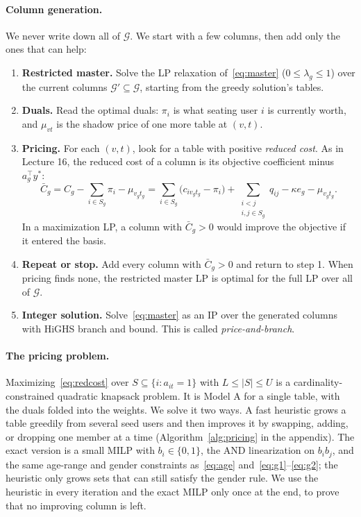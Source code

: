 \documentclass[10pt]{article}
\newcommand{\G}{\mathcal{G}}
\begin{document}
\paragraph{Column generation.} We never write down all of $\G$. We start with a few columns, then add only the ones that can help:
\begin{enumerate}[leftmargin=*]
\item \textbf{Restricted master.} Solve the LP relaxation of~\eqref{eq:master} ($0\le\lambda_g\le1$) over the current columns $\G'\subseteq\G$, starting from the greedy solution's tables.
\item \textbf{Duals.} Read the optimal duals: $\pi_i$ is what seating user $i$ is currently worth, and $\mu_{vt}$ is the shadow price of one more table at $(v,t)$.
\item \textbf{Pricing.} For each $(v,t)$, look for a table with positive \emph{reduced cost}. As in Lecture 16, the reduced cost of a column is its objective coefficient minus $a_g^\top y^*$:
\begin{equation}
\bar{C}_g = C_g - \textstyle\sum_{i\in S_g}\pi_i - \mu_{v_g t_g}
= \sum_{i\in S_g}\bigl(c_{i v_g t_g} - \pi_i\bigr) + \sum_{\substack{i<j\\ i,j\in S_g}} q_{ij} - \kappa e_g - \mu_{v_g t_g}.
\label{eq:redcost}
\end{equation}
In a maximization LP, a column with $\bar C_g>0$ would improve the objective if it entered the basis.
\item \textbf{Repeat or stop.} Add every column with $\bar C_g>0$ and return to step 1. When pricing finds none, the restricted master LP is optimal for the full LP over all of $\G$.
\item \textbf{Integer solution.} Solve~\eqref{eq:master} as an IP over the generated columns with HiGHS branch and bound. This is called \emph{price-and-branch}.
\end{enumerate}

\paragraph{The pricing problem.} Maximizing~\eqref{eq:redcost} over $S\subseteq\{i: a_{it}=1\}$ with $L\le|S|\le U$ is a cardinality-constrained quadratic knapsack problem. It is Model A for a single table, with the duals folded into the weights. We solve it two ways. A fast heuristic grows a table greedily from several seed users and then improves it by swapping, adding, or dropping one member at a time (Algorithm~\ref{alg:pricing} in the appendix). The exact version is a small MILP with $b_i\in\{0,1\}$, the AND linearization on $b_ib_j$, and the same age-range and gender constraints as~\eqref{eq:age} and~\eqref{eq:g1}--\eqref{eq:g2}; the heuristic only grows sets that can still satisfy the gender rule. We use the heuristic in every iteration and the exact MILP only once at the end, to prove that no improving column is left.
\end{document}
